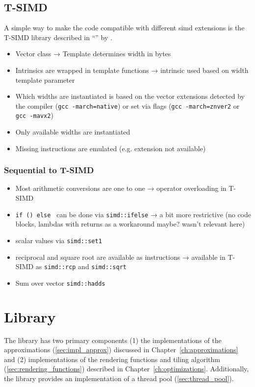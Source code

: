 \documentclass[a4paper, 11pt]{memoir}
\begin{document}
    \subsection{T-SIMD}
    \label{sec:tsimd}
    A simple way to make the code compatible with different \gls{simd} extensions is the T-SIMD library described in
    \enquote{} \cite{own_moeller_16_2} by \citeauthor{own_moeller_16_2}.
    \begin{itemize}
        \item Vector class →  Template determines width in bytes
        \item Intrinsics are wrapped in template functions →  intrinsic used based on width template parameter
        \item Which widths are instantiated is based on the vector extensions detected by the compiler (\texttt{gcc -march=native}) or set via flags (\texttt{gcc -march=znver2} or \texttt{gcc -mavx2})
        \item Only available widths are instantiated
        \item Missing instructions are emulated (e.g. extension not available)
    \end{itemize}

    \subsubsection{Sequential to T-SIMD}
    \label{sec:seq_to_tsimd}
    \begin{itemize}
        \item Most arithmetic conversions are one to one →  operator overloading in T-SIMD
        \item \texttt{if () {} else {}} can be done via \texttt{simd::ifelse} →  a bit more restrictive (no code blocks, lambdas with returns as a workaround maybe? wasn't relevant here)
        \item scalar values via \texttt{simd::set1}
        \item reciprocal and square root are available as instructions →  available in T-SIMD as \texttt{simd::rcp} and \texttt{simd::sqrt}
        \item Sum over vector \texttt{simd::hadds}
    \end{itemize}

    \section{Library}
    \label{sec:library}
    The library has two primary components (1) the implementations of the approximations (\ref{sec:impl_approx})
    discussed in Chapter~\ref{ch:approximations} and (2) implementations of the rendering functions and tiling
    algorithm (\ref{sec:rendering_functions}) described in Chapter~\ref{ch:optimizations}. Additionally, the library
    provides an implementation of a thread pool (\ref{sec:thread_pool}).
\end{document}
